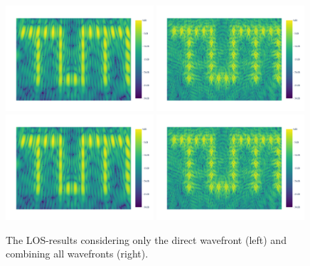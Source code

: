 \begin{figure}[ht]
    \centering
    \includegraphics[page=2, width=0.49\textwidth]{figures/multipath_los_direct.pdf}
    \includegraphics[page=2, width=0.49\textwidth]{figures/multipath_los_combined.pdf}
    \includegraphics[page=1, width=0.49\textwidth]{figures/multipath_los_direct.pdf}
    \includegraphics[page=1, width=0.49\textwidth]{figures/multipath_los_combined.pdf}
    \caption{The LOS-results considering only the direct wavefront (left) and combining all wavefronts (right).}\label{fig:MultipathLOS}
\end{figure}

